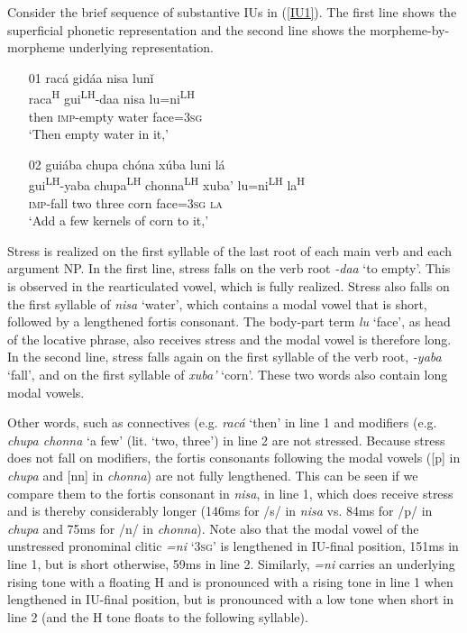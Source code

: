 Consider the brief sequence of substantive IUs in (\ref{IU1}). The first line shows the superficial phonetic representation and the second line shows the morpheme-by-morpheme underlying representation.


\ea\label{IU1}
\begin{itemize}
\item[01]
\glll rac\'{a} gid\'{a}a nisa lun\v{i} \\
raca\textsuperscript{H} gui\textsuperscript{LH}-daa nisa lu=ni\textsuperscript{LH}	\\
then \textsc{imp}-empty water face=\textsc{3sg} \\
\glt `Then empty water in it,'



\item[02]
\glll gui\'{a}ba chupa ch\'{o}na x\'{u}ba luni l\'{a} \\
gui\textsuperscript{LH}-yaba chupa\textsuperscript{LH} chonna\textsuperscript{LH} xuba' lu=ni\textsuperscript{LH} la\textsuperscript{H}	\\
\textsc{imp}-fall two three corn face=\textsc{3sg} \textsc{la} \\
\glt `Add a few kernels of corn to it,'

\end{itemize}
\z

Stress is realized on the first syllable of the last root of each main verb and each argument NP. In the first line, stress falls on the verb root \textit{-daa} `to empty'. This is observed in the rearticulated vowel, which is fully realized. Stress also falls on the first syllable of \textit{nisa} `water', which contains a modal vowel that is short, followed by a lengthened fortis consonant. The body-part term \textit{lu} `face', as head of the locative phrase, also receives stress and the modal vowel is therefore long. In the second line, stress falls again on the first syllable of the verb root, \textit{-yaba} `fall', and on the first syllable of \textit{xuba'} `corn'. These two words also contain long modal vowels. 

Other words, such as connectives (e.g. \textit{rac\'{a}} `then' in line 1 and modifiers (e.g. \textit{chupa chonna} `a few' (lit. `two, three') in line 2 are not stressed. Because stress does not fall on modifiers, the fortis consonants following the modal vowels ([p] in \textit{chupa} and [nn] in \textit{chonna}) are not fully lengthened. This can be seen if we compare them to the fortis consonant in \textit{nisa}, in line 1, which does receive stress and is thereby considerably longer (146ms for /s/ in \textit{nisa} vs. 84ms for /p/ in \textit{chupa} and 75ms for /n/ in \textit{chonna}). Note also that the modal vowel of the unstressed pronominal clitic \textit{=ni} `3\textsc{sg}' is lengthened in IU-final position, 151ms in line 1, but is short otherwise, 59ms in line 2. Similarly, \textit{=ni}  carries an underlying rising tone with a floating H and is pronounced with a rising tone in line 1 when lengthened in IU-final position, but is pronounced with a low tone when short in line 2 (and the H tone floats to the following syllable).

